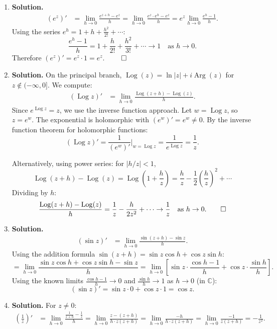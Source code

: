 \begin{enumerate}
\item \textbf{Solution.}
\begin{align*}
(e^z)' &= \lim_{h \to 0} \frac{e^{z+h} - e^z}{h} = \lim_{h \to 0} \frac{e^z \cdot e^h - e^z}{h} = e^z \lim_{h \to 0} \frac{e^h - 1}{h}.
\end{align*}
Using the series $e^h = 1 + h + \frac{h^2}{2!} + \cdots$:
\[
\frac{e^h - 1}{h} = 1 + \frac{h}{2!} + \frac{h^2}{3!} + \cdots \to 1 \quad \text{as } h \to 0.
\]
Therefore $(e^z)' = e^z \cdot 1 = e^z$. $\qed$

\item \textbf{Solution.}
On the principal branch, $\operatorname{Log}(z) = \ln|z| + i\operatorname{Arg}(z)$ for $z \notin (-\infty, 0]$. We compute:
\begin{align*}
(\operatorname{Log} z)' &= \lim_{h \to 0} \frac{\operatorname{Log}(z+h) - \operatorname{Log}(z)}{h}.
\end{align*}
Since $e^{\operatorname{Log} z} = z$, we use the inverse function approach. Let $w = \operatorname{Log} z$, so $z = e^w$. The exponential is holomorphic with $(e^w)' = e^w \neq 0$. By the inverse function theorem for holomorphic functions:
\[
(\operatorname{Log} z)' = \frac{1}{(e^w)'}\bigg|_{w = \operatorname{Log} z} = \frac{1}{e^{\operatorname{Log} z}} = \frac{1}{z}.
\]

Alternatively, using power series: for $|h/z| < 1$,
\[
\operatorname{Log}(z+h) - \operatorname{Log}(z) = \operatorname{Log}\!\left(1 + \frac{h}{z}\right) = \frac{h}{z} - \frac{1}{2}\left(\frac{h}{z}\right)^2 + \cdots
\]
Dividing by $h$:
\[
\frac{\operatorname{Log}(z+h) - \operatorname{Log}(z)}{h} = \frac{1}{z} - \frac{h}{2z^2} + \cdots \to \frac{1}{z} \quad \text{as } h \to 0. \qed
\]

\item \textbf{Solution.}
\begin{align*}
(\sin z)' &= \lim_{h \to 0} \frac{\sin(z+h) - \sin z}{h}.
\end{align*}
Using the addition formula $\sin(z+h) = \sin z \cos h + \cos z \sin h$:
\[
= \lim_{h \to 0} \frac{\sin z \cos h + \cos z \sin h - \sin z}{h} = \lim_{h \to 0}\left[\sin z \cdot \frac{\cos h - 1}{h} + \cos z \cdot \frac{\sin h}{h}\right].
\]
Using the known limits $\frac{\cos h - 1}{h} \to 0$ and $\frac{\sin h}{h} \to 1$ as $h \to 0$ (in $\mathbb{C}$):
\[
(\sin z)' = \sin z \cdot 0 + \cos z \cdot 1 = \cos z.
\]

\item \textbf{Solution.}
For $z \neq 0$:
\begin{align*}
\left(\frac{1}{z}\right)' &= \lim_{h \to 0} \frac{\frac{1}{z+h} - \frac{1}{z}}{h} = \lim_{h \to 0} \frac{z - (z+h)}{h \cdot z(z+h)} = \lim_{h \to 0} \frac{-h}{h \cdot z(z+h)} = \lim_{h \to 0} \frac{-1}{z(z+h)} = -\frac{1}{z^2}.
\end{align*}


\end{enumerate}
